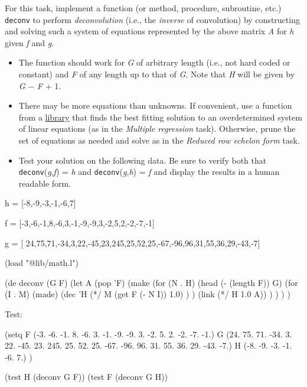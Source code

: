 For this task, implement a function (or method, procedure, subroutine,
etc.) \texttt{deconv} to perform \emph{deconvolution} (i.e., the
\emph{inverse} of convolution) by constructing and solving such a system
of equations represented by the above matrix \emph{A} for \emph{h} given
\emph{f} and \emph{g}.

\begin{itemize}
\item
  The function should work for \emph{G} of arbitrary length (i.e., not
  hard coded or constant) and \emph{F} of any length up to that of
  \emph{G}. Note that \textbar{} \emph{H} \textbar{} will be given by
  \textbar{} \emph{G} \textbar{} − \textbar{} \emph{F} \textbar{} + 1.
\item There may be more equations than unknowns. If convenient, use a
  function from a
  \href{http://www.netlib.org/lapack/lug/node27.html}{library} that
  finds the best fitting solution to an overdetermined system of
  linear equations (as in the \emph{Multiple regression} task).
  Otherwise, prune the set of equations as needed and solve as in the
  \emph{Reduced row echelon form} task.
\item
  Test your solution on the following data. Be sure to verify both that
  \texttt{deconv}(\emph{g},\emph{f}) = \emph{h} and
  \texttt{deconv}(\emph{g},\emph{h}) = \emph{f} and display the results
  in a human readable form.
\end{itemize}

\begin{wideverbatim}

h = [-8,-9,-3,-1,-6,7] 

f = [-3,-6,-1,8,-6,3,-1,-9,-9,3,-2,5,2,-2,-7,-1]

g = [ 24,75,71,-34,3,22,-45,23,245,25,52,25,-67,-96,96,31,55,36,29,-43,-7]

\end{wideverbatim}

\begin{wideverbatim}

(load "@lib/math.l")
 
(de deconv (G F)
   (let A (pop 'F)
      (make
         (for (N . H) (head (- (length F)) G)
            (for (I . M) (made)
               (dec 'H
                  (*/ M (get F (- N I)) 1.0) ) )
            (link (*/ H 1.0 A)) ) ) ) )

Test:

(setq
   F (-3. -6. -1. 8. -6. 3. -1. -9. -9. 3. -2. 5. 2. -2. -7. -1.)
   G (24. 75. 71. -34. 3. 22. -45. 23. 245. 25. 52. 25. -67. -96.
   96. 31. 55. 36. 29. -43. -7.)
   H (-8. -9. -3. -1. -6. 7.) )
 
(test H (deconv G F))
(test F (deconv G H))

\end{wideverbatim}


